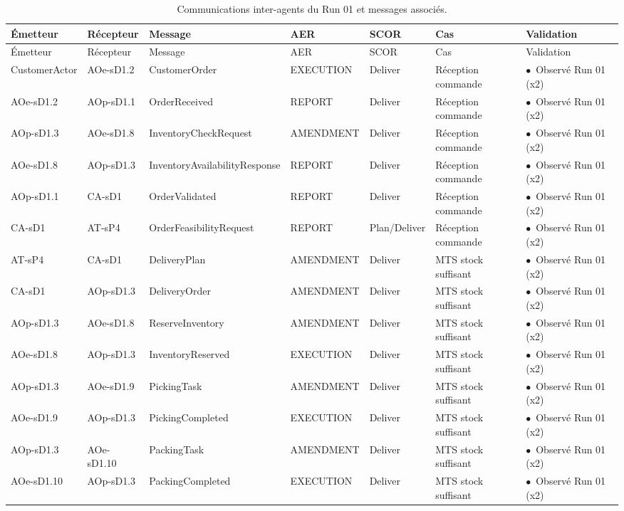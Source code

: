 \documentclass[11pt,a4paper]{article}
\newcommand{\stRUN}{\ensuremath{\bullet}~Observé Run 01}
\begin{document}
\begin{landscape}
{\scriptsize
\setlength{\tabcolsep}{3pt}
\begin{longtable}{p{2.9cm}p{2.9cm}p{5.6cm}p{2.1cm}p{1.4cm}p{2.6cm}p{2.6cm}}
\caption{Communications inter-agents du Run 01 et messages associés.}\label{tab:synthese}\\
\toprule
Émetteur & Récepteur & Message & AER & SCOR & Cas & Validation \\
\midrule
\endfirsthead
\toprule
Émetteur & Récepteur & Message & AER & SCOR & Cas & Validation \\
\midrule
\endhead
\bottomrule
\endlastfoot
CustomerActor & AOe-sD1.2 & \mbox{CustomerOrder} & EXECUTION & Deliver & Réception commande & \stRUN{} (x2) \\
AOe-sD1.2 & AOp-sD1.1 & \mbox{OrderReceived} & REPORT & Deliver & Réception commande & \stRUN{} (x2) \\
AOp-sD1.3 & AOe-sD1.8 & \mbox{InventoryCheckRequest} & AMENDMENT & Deliver & Réception commande & \stRUN{} (x2) \\
AOe-sD1.8 & AOp-sD1.3 & \mbox{InventoryAvailabilityResponse} & REPORT & Deliver & Réception commande & \stRUN{} (x2) \\
AOp-sD1.1 & CA-sD1 & \mbox{OrderValidated} & REPORT & Deliver & Réception commande & \stRUN{} (x2) \\
CA-sD1 & AT-sP4 & \mbox{OrderFeasibilityRequest} & REPORT & Plan/\allowbreak{}Deliver & Réception commande & \stRUN{} (x2) \\
AT-sP4 & CA-sD1 & \mbox{DeliveryPlan} & AMENDMENT & Deliver & MTS stock suffisant & \stRUN{} (x2) \\
CA-sD1 & AOp-sD1.3 & \mbox{DeliveryOrder} & AMENDMENT & Deliver & MTS stock suffisant & \stRUN{} (x2) \\
AOp-sD1.3 & AOe-sD1.8 & \mbox{ReserveInventory} & AMENDMENT & Deliver & MTS stock suffisant & \stRUN{} (x2) \\
AOe-sD1.8 & AOp-sD1.3 & \mbox{InventoryReserved} & EXECUTION & Deliver & MTS stock suffisant & \stRUN{} (x2) \\
AOp-sD1.3 & AOe-sD1.9 & \mbox{PickingTask} & AMENDMENT & Deliver & MTS stock suffisant & \stRUN{} (x2) \\
AOe-sD1.9 & AOp-sD1.3 & \mbox{PickingCompleted} & EXECUTION & Deliver & MTS stock suffisant & \stRUN{} (x2) \\
AOp-sD1.3 & AOe-sD1.10 & \mbox{PackingTask} & AMENDMENT & Deliver & MTS stock suffisant & \stRUN{} (x2) \\
AOe-sD1.10 & AOp-sD1.3 & \mbox{PackingCompleted} & EXECUTION & Deliver & MTS stock suffisant & \stRUN{} (x2) \\

\end{longtable}}
\end{landscape}
\end{document}
